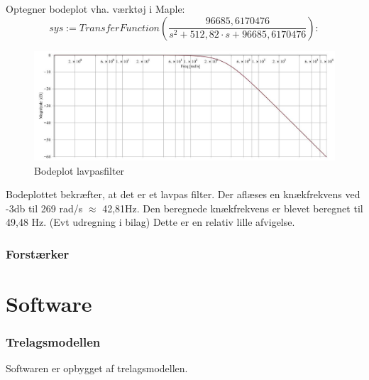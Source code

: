 Optegner bodeplot vha. værktøj i Maple:
$$sys := TransferFunction(\frac{96685,6170476}{s^2+512,82 \cdot s + 96685,6170476}):$$

\begin{figure}[H]
\centering
\includegraphics[scale=0.50]{bodeplot.PNG}
\caption{Bodeplot lavpasfilter}
\end{figure}

Bodeplottet bekræfter, at det er et lavpas filter. Der aflæses en knækfrekvens ved -3db til 269 rad/s $\approx$ 42,81Hz. Den beregnede knækfrekvens er blevet beregnet til 49,48 Hz. (Evt udregning i bilag)	
Dette er en relativ lille afvigelse. 

\subsubsection{Forstærker}

\section{Software}

\subsubsection{Trelagsmodellen}
Softwaren er opbygget af trelagsmodellen. 


